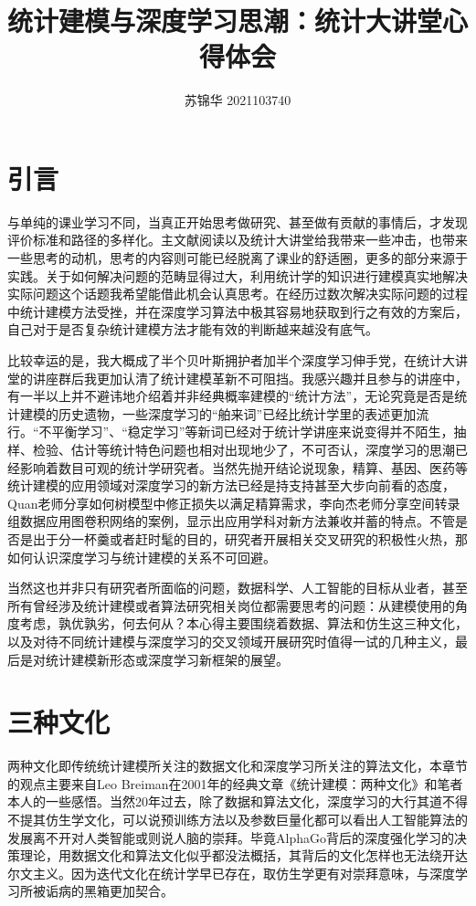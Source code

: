 \documentclass{ctexart}
\title{统计建模与深度学习思潮：统计大讲堂心得体会}
\author{苏锦华 2021103740}
\begin{document}
\maketitle



\section{引言}

与单纯的课业学习不同，当真正开始思考做研究、甚至做有贡献的事情后，才发现评价标准和路径的多样化。主文献阅读以及统计大讲堂给我带来一些冲击，也带来一些思考的动机，思考的内容则可能已经脱离了课业的舒适圈，更多的部分来源于实践。关于如何解决问题的范畴显得过大，利用统计学的知识进行建模真实地解决实际问题这个话题我希望能借此机会认真思考。在经历过数次解决实际问题的过程中统计建模方法受挫，并在深度学习算法中极其容易地获取到行之有效的方案后，自己对于是否复杂统计建模方法才能有效的判断越来越没有底气。

比较幸运的是，我大概成了半个贝叶斯拥护者加半个深度学习伸手党，在统计大讲堂的讲座群后我更加认清了统计建模革新不可阻挡。我感兴趣并且参与的讲座中，有一半以上并不避讳地介绍着并非经典概率建模的“统计方法”，无论究竟是否是统计建模的历史遗物，一些深度学习的“舶来词”已经比统计学里的表述更加流行。“不平衡学习”、“稳定学习”等新词已经对于统计学讲座来说变得并不陌生，抽样、检验、估计等统计特色问题也相对出现地少了，不可否认，深度学习的思潮已经影响着数目可观的统计学研究者。当然先抛开结论说现象，精算、基因、医药等统计建模的应用领域对深度学习的新方法已经是持支持甚至大步向前看的态度，Quan老师分享如何树模型中修正损失以满足精算需求，李向杰老师分享空间转录组数据应用图卷积网络的案例，显示出应用学科对新方法兼收并蓄的特点。不管是否是出于分一杯羹或者赶时髦的目的，研究者开展相关交叉研究的积极性火热，那如何认识深度学习与统计建模的关系不可回避。

当然这也并非只有研究者所面临的问题，数据科学、人工智能的目标从业者，甚至所有曾经涉及统计建模或者算法研究相关岗位都需要思考的问题：从建模使用的角度考虑，孰优孰劣，何去何从？本心得主要围绕着数据、算法和仿生这三种文化，以及对待不同统计建模与深度学习的交叉领域开展研究时值得一试的几种主义，最后是对统计建模新形态或深度学习新框架的展望。

\section{三种文化}

两种文化即传统统计建模所关注的数据文化和深度学习所关注的算法文化，本章节的观点主要来自Leo Breiman在2001年的经典文章《统计建模：两种文化》和笔者本人的一些感悟。当然20年过去，除了数据和算法文化，深度学习的大行其道不得不提其仿生学文化，可以说预训练方法以及参数巨量化都可以看出人工智能算法的发展离不开对人类智能或则说人脑的崇拜。毕竟AlphaGo背后的深度强化学习的决策理论，用数据文化和算法文化似乎都没法概括，其背后的文化怎样也无法绕开达尔文主义。因为迭代文化在统计学早已存在，取仿生学更有对崇拜意味，与深度学习所被诟病的黑箱更加契合。
\end{document}
